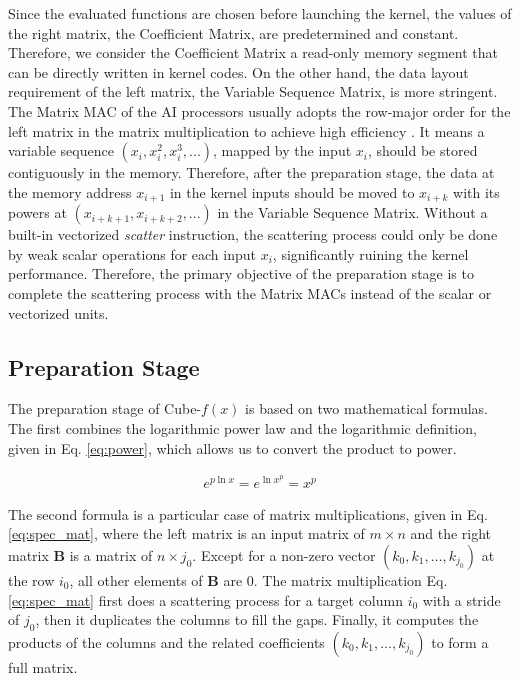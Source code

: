 \documentclass[12pt]{extbook}
\begin{document}
Since the evaluated functions are chosen before launching the kernel, the values of the right matrix, the Coefficient Matrix, are predetermined and constant. Therefore, we consider the Coefficient Matrix a read-only memory segment that can be directly written in kernel codes. On the other hand, the data layout requirement of the left matrix, the Variable Sequence Matrix, is more stringent. The Matrix MAC of the AI processors usually adopts the row-major order for the left matrix in the matrix multiplication to achieve high efficiency \cite{cambricon, CANN, jax}. It means a variable sequence $(x_{i}, x_{i}^2,  x_{i}^3, ...)$, mapped by the input $x_{i}$, should be stored contiguously in the memory. Therefore, after the preparation stage, the data at the memory address $x_{i + 1}$ in the kernel inputs should be moved to $x_{i + k}$ with its powers at $(x_{i + k + 1}, x_{i + k + 2}, ...)$ in the Variable Sequence Matrix. Without a built-in vectorized \textit{scatter} instruction, the scattering process could only be done by weak scalar operations for each input $x_{i}$, significantly ruining the kernel performance. Therefore, the primary objective of the preparation stage is to complete the scattering process with the Matrix MACs instead of the scalar or vectorized units.

\subsection{Preparation Stage}

The preparation stage of Cube-$f(x)$ is based on two mathematical formulas. The first combines the logarithmic power law and the logarithmic definition, given in Eq. \ref{eq:power}, which allows us to convert the product to power.

\begin{equation}
    \label{eq:power}
    \begin{aligned}
        e^{p \ln x} = e^{\ln x^p} = x^p
    \end{aligned}
    \end{equation}

The second formula is a particular case of matrix multiplications, given in Eq. \ref{eq:spec_mat}, where the left matrix is an input matrix of $m \times n$ and the right matrix $\textbf{B}$ is a matrix of $n \times j_0$. Except for a non-zero vector $(k_0, k_1, \dots, k_{j_0})$ at the row $i_0$, all other elements of $\textbf{B}$ are $0$. The matrix multiplication Eq. \ref{eq:spec_mat} first does a scattering process for a target column $i_0$ with a stride of $j_0$, then it duplicates the columns to fill the gaps. Finally, it computes the products of the columns and the related coefficients $(k_0, k_1, \dots, k_{j_0})$ to form a full matrix.
\end{document}
